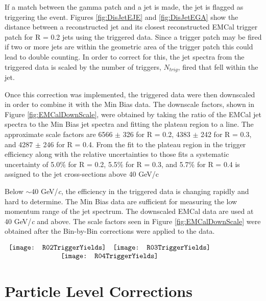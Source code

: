 \noindent
If a match between the gamma patch and a jet is made, the jet is flagged as triggering the event.  Figures \ref{fig:DisJetEJE} and \ref{fig:DisJetEGA} show the distance between a reconstructed jet and its closest reconstructed EMCal trigger patch for R = 0.2 jets using the triggered data.  Since a trigger patch may be fired if two or more jets are within the geometric area of the trigger patch this could lead to double counting.  In order to correct for this, the jet spectra from the triggered data is scaled by the number of triggers, $N_{trig}$, fired that fell within the jet.  

Once this correction was implemented, the triggered data were then downscaled in order to combine it with the Min Bias data.  The downscale factors, shown in Figure \ref{fig:EMCalDownScale}, were obtained by taking the ratio of the EMCal jet spectra to the Min Bias jet spectra and fitting the plateau region to a line.  The approximate scale factors are 6566 $\pm$ 326 for R = 0.2, 4383 $\pm$ 242 for R = 0.3, and 4287 $\pm$ 246 for R = 0.4.  From the fit to the plateau region in the trigger efficiency along with the relative uncertainties to those fits a systematic uncertainty of 5.0\% for R = 0.2, 5.5\% for R = 0.3, and 5.7\% for R = 0.4 is assigned to the jet cross-sections above 40 GeV/c

Below $\sim$40 GeV/\textit{c}, the efficiency in the triggered data is changing rapidly and hard to determine.  The Min Bias data are sufficient for measuring the low momentum range of the jet spectrum.  The downscaled EMCal data are used at 40 GeV/\textit{c} and above.  The scale factors seen in Figure \ref{fig:EMCalDownScale} were obtained after the Bin-by-Bin corrections were applied to the data.


\begin{figure*}[t!]
$\begin{array}{rl}
    \texttt{[image: R02TriggerYields]} &
    \texttt{[image: R03TriggerYields]}\\
    \multicolumn{2}{c}{\texttt{[image: R04TriggerYields]}}
\end{array}$
\caption[EMCal triggered data correction factors for R=0.2, R=0.3, and R=0.4 jets.]{\label{fig:EMCalDownScale}EMCal triggered data correction factors for R=0.2, R=0.3, and R=0.4 jets.}
\end{figure*}
 

\section{Particle Level Corrections}

